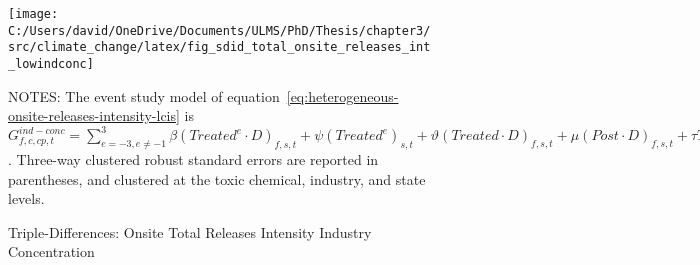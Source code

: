 \begin{figure}[H]
    \centering
    \texttt{[image: C:/Users/david/OneDrive/Documents/ULMS/PhD/Thesis/chapter3/src/climate\_change/latex/fig\_sdid\_total\_onsite\_releases\_int\_lowindconc]}
    \caption{Triple-Differences: Onsite Total Releases Intensity Industry Concentration}
    \label{fig:heterogeneous-onsite-releases-intensity-lcis}
    \begin{minipage}{\columnwidth}
        \vspace{0.05in}
        \tiny NOTES: The event study model of equation~\ref{eq:heterogeneous-onsite-releases-intensity-lcis} is $G_{f,c,cp,t}^{ind-conc} = \sum_{{e = -3},{e \neq -1}}^{3} \beta (Treated^{e} \cdot D)_{f,s,t} + \psi (Treated^{e})_{s,t} + \vartheta (Treated \cdot D)_{f,s,t} + \mu (Post \cdot D)_{f,s,t} + \tau Treated_{s,t} + \rho D_{f,s,t} + \alpha Post_{t} + \delta X_{v,c,t-1} + \omega F_{f,t} + \lambda_{t} + \gamma_{f} + \phi_{cp} + \zeta_{c} + \eta_{c,t} + \theta_{cp,t} + \varepsilon_{f,c,cp,t}$. Three-way clustered robust standard errors are reported in parentheses, and clustered at the toxic chemical, industry, and state levels.
    \end{minipage}
\end{figure}